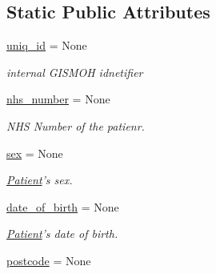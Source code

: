 \subsection*{Static Public Attributes}
\begin{DoxyCompactItemize}
\item 
\hypertarget{classstore_1_1_store_1_1_patient_a7ce52748fe80fbdd12ebb3ce4b880d28}{\hyperlink{classstore_1_1_store_1_1_patient_a7ce52748fe80fbdd12ebb3ce4b880d28}{uniq\-\_\-id} = None}\label{classstore_1_1_store_1_1_patient_a7ce52748fe80fbdd12ebb3ce4b880d28}

\begin{DoxyCompactList}\small\item\em internal G\-I\-S\-M\-O\-H idnetifier \end{DoxyCompactList}\item 
\hypertarget{classstore_1_1_store_1_1_patient_a124a3bd47ef0cc7bc7506db89bd7bf00}{\hyperlink{classstore_1_1_store_1_1_patient_a124a3bd47ef0cc7bc7506db89bd7bf00}{nhs\-\_\-number} = None}\label{classstore_1_1_store_1_1_patient_a124a3bd47ef0cc7bc7506db89bd7bf00}

\begin{DoxyCompactList}\small\item\em N\-H\-S Number of the patienr. \end{DoxyCompactList}\item 
\hypertarget{classstore_1_1_store_1_1_patient_a3ca202944df0822cb4c47afdbc083ed8}{\hyperlink{classstore_1_1_store_1_1_patient_a3ca202944df0822cb4c47afdbc083ed8}{sex} = None}\label{classstore_1_1_store_1_1_patient_a3ca202944df0822cb4c47afdbc083ed8}

\begin{DoxyCompactList}\small\item\em \hyperlink{classstore_1_1_store_1_1_patient}{Patient}'s sex. \end{DoxyCompactList}\item 
\hypertarget{classstore_1_1_store_1_1_patient_a9abe08afce1a9dae8ee8e9cd9f5da70e}{\hyperlink{classstore_1_1_store_1_1_patient_a9abe08afce1a9dae8ee8e9cd9f5da70e}{date\-\_\-of\-\_\-birth} = None}\label{classstore_1_1_store_1_1_patient_a9abe08afce1a9dae8ee8e9cd9f5da70e}

\begin{DoxyCompactList}\small\item\em \hyperlink{classstore_1_1_store_1_1_patient}{Patient}'s date of birth. \end{DoxyCompactList}\item 
\hypertarget{classstore_1_1_store_1_1_patient_a2f93d8f515944b9ff186c28af65a2b2c}{\hyperlink{classstore_1_1_store_1_1_patient_a2f93d8f515944b9ff186c28af65a2b2c}{postcode} = None}\label{classstore_1_1_store_1_1_patient_a2f93d8f515944b9ff186c28af65a2b2c}


\end{DoxyCompactItemize}

